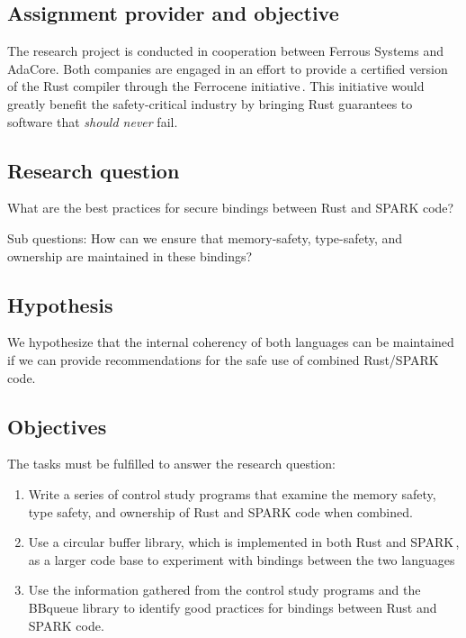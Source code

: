 \documentclass[nomenclature, english, bibtex]{kththesis}
\begin{document}
\subsection{Assignment provider and objective}

The research project is conducted in cooperation between Ferrous Systems and AdaCore. Both companies are engaged in an effort to provide a certified version of the Rust compiler through the Ferrocene initiative\,\cite{noauthor_ferrocene_2023}. This initiative would greatly benefit the \gls{safety-critical} industry by bringing Rust guarantees to software that \emph{should never} fail.

\subsection{Research question}
\label{sec:researchQuestion}

What are the best practices for secure bindings between Rust and SPARK code?

Sub questions: How can we ensure that \first \gls{memory-safety}, \Second \gls{type-safety}, and \third \gls{ownership} are maintained in these bindings?

\subsection{Hypothesis}
We hypothesize that the internal coherency of both languages can be maintained if we can provide recommendations for the safe use of combined Rust/SPARK code.

\subsection{Objectives}
The tasks must be fulfilled to answer the research question:
\begin{enumerate}
    \item Write a series of control study programs that examine the memory safety, type safety, and ownership of Rust and SPARK code when combined.
    \item Use a circular buffer library, which is implemented in both Rust and SPARK\,\cite{munns_bbqueue_2022,chouteau_bbqueue_nodate}, as a larger code base to experiment with bindings between the two languages
    \item Use the information gathered from the control study programs and the BBqueue library to identify good practices for bindings between Rust and SPARK code.
\end{enumerate}
\end{document}
